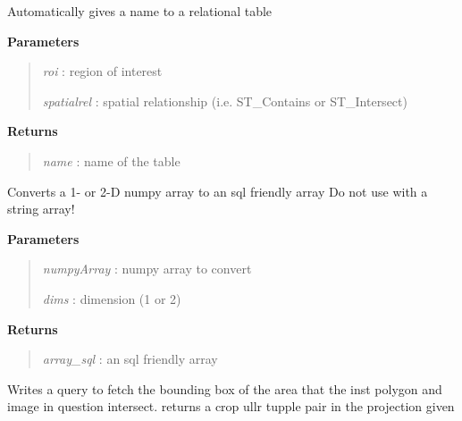 \documentclass[letterpaper,10pt,openany,oneside]{sphinxmanual}
\begin{document}
\begin{fulllineitems}
\begin{fulllineitems}
\label{code:Database.Database.nameTable}
Automatically gives a name to a relational table

\textbf{Parameters}
\begin{quote}

\emph{roi}        : region of interest

\emph{spatialrel} : spatial relationship (i.e. ST\_Contains or ST\_Intersect)
\end{quote}

\textbf{Returns}
\begin{quote}

\emph{name}       : name of the table
\end{quote}

\end{fulllineitems}


\begin{fulllineitems}
\label{code:Database.Database.numpy2sql}
Converts a 1- or 2-D numpy array to an sql friendly array
Do not use with a string array!

\textbf{Parameters}
\begin{quote}

\emph{numpyArray} : numpy array to convert

\emph{dims}       : dimension (1 or 2)
\end{quote}

\textbf{Returns}
\begin{quote}

\emph{array\_sql}  : an sql friendly array
\end{quote}

\end{fulllineitems}


\begin{fulllineitems}
\label{code:Database.Database.qryCropZone}
Writes a query to fetch the bounding box of the area that the inst polygon and
image in question intersect.
returns a crop ullr tupple pair in the projection given


\end{fulllineitems}
\end{fulllineitems}
\end{document}
